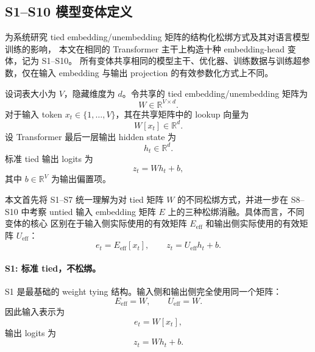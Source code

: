 
\subsection{S1--S10 模型变体定义}

为系统研究 tied embedding/unembedding 矩阵的结构化松绑方式及其对语言模型训练的影响，
本文在相同的 Transformer 主干上构造十种 embedding-head 变体，记为 S1--S10。
所有变体共享相同的模型主干、优化器、训练数据与训练超参数，仅在输入 embedding
与输出 projection 的有效参数化方式上不同。

设词表大小为 $V$，隐藏维度为 $d$。令共享的 tied embedding/unembedding 矩阵为
\begin{equation}
    W \in \mathbb{R}^{V \times d}.
\end{equation}
对于输入 token $x_t \in \{1,\dots,V\}$，其在共享矩阵中的 lookup 向量为
\begin{equation}
    W[x_t] \in \mathbb{R}^{d}.
\end{equation}
设 Transformer 最后一层输出 hidden state 为
\begin{equation}
    h_t \in \mathbb{R}^{d}.
\end{equation}
标准 tied 输出 logits 为
\begin{equation}
    z_t = W h_t + b,
\end{equation}
其中 $b \in \mathbb{R}^{V}$ 为输出偏置项。

本文首先将 S1--S7 统一理解为对 tied 矩阵 $W$ 的不同松绑方式，并进一步在 S8--S10
中考察 untied 输入 embedding 矩阵 $E$ 上的三种松绑消融。具体而言，不同变体的核心
区别在于输入侧实际使用的有效矩阵 $E_{\mathrm{eff}}$ 和输出侧实际使用的有效矩阵
$U_{\mathrm{eff}}$：
\begin{equation}
    e_t = E_{\mathrm{eff}}[x_t], \qquad
    z_t = U_{\mathrm{eff}} h_t + b.
\end{equation}

\paragraph{S1: 标准 tied，不松绑。}
S1 是最基础的 weight tying 结构。输入侧和输出侧完全使用同一个矩阵：
\begin{equation}
    E_{\mathrm{eff}} = W, \qquad
    U_{\mathrm{eff}} = W.
\end{equation}
因此输入表示为
\begin{equation}
    e_t = W[x_t],
\end{equation}
输出 logits 为
\begin{equation}
    z_t = W h_t + b.
\end{equation}

